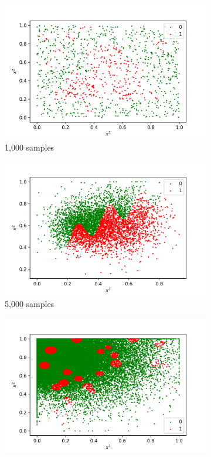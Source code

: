 \documentclass[acmsmall,nonacm]{acmart}
\begin{document}
\begin{figure}
\centering
\begin{subfigure}{.32\textwidth}
  \centering
  \includegraphics[width=\textwidth]{assets/ds_a.png}
  \caption{1,000 samples}
\end{subfigure}
\begin{subfigure}{.32\textwidth}
  \centering
  \includegraphics[width=\textwidth]{assets/ds_b.png}
  \caption{5,000 samples}
\end{subfigure}
\begin{subfigure}{.32\textwidth}
  \centering
  \includegraphics[width=\textwidth]{assets/ds_c.png}

\end{subfigure}
\end{figure}
\end{document}
